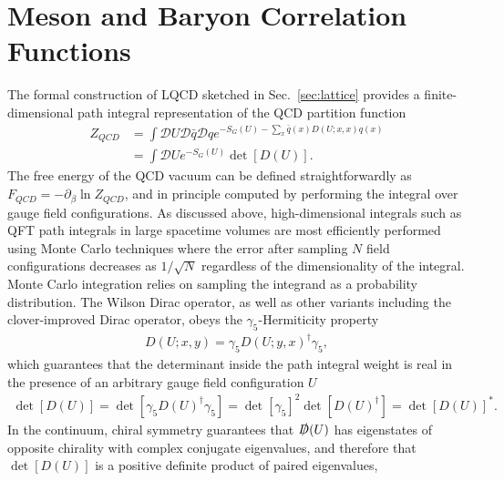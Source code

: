 \section{Meson and Baryon Correlation Functions}\label{sec:corr}

The formal construction of LQCD sketched in Sec.~\ref{sec:lattice} provides a finite-dimensional path integral representation of the QCD partition function
\begin{equation}
  \begin{split}
    Z_{QCD} &= \int \mathcal{D}U\mathcal{D}\bar{q}\mathcal{D}q e^{-S_G(U) - \sum_x \bar{q}(x)D(U;x,x)q(x)} \\
    &= \int \mathcal{D}U e^{-S_G(U)}\det[D(U)].
  \end{split}\label{eq:qcdZ}
\end{equation}
The free energy of the QCD vacuum can be defined straightforwardly as $F_{QCD} = -\partial_\beta \ln Z_{QCD}$, and in principle computed by performing the integral over gauge field configurations.
As discussed above, high-dimensional integrals such as QFT path integrals in large spacetime volumes are most efficiently performed using Monte Carlo techniques where the error after sampling $N$ field configurations decreases as $1/\sqrt{N}$ regardless of the dimensionality of the integral.
Monte Carlo integration relies on sampling the integrand as a probability distribution.
The Wilson Dirac operator, as well as other variants including the clover-improved Dirac operator, obeys the $\gamma_5$-Hermiticity property
\begin{equation}
  \begin{split}
    D(U;x,y) = \gamma_5 D(U;y,x)^\dagger \gamma_5,
  \end{split}\label{eq:g5Hermiticity}
\end{equation}
which guarantees that the determinant inside the path integral weight is real in the presence of an arbitrary gauge field configuration $U$
\begin{equation}
  \begin{split}
    \det[D(U)] = \det[\gamma_5 D(U)^\dagger \gamma_5] = \det[\gamma_5]^2 \det[D(U)^\dagger] = \det[D(U)]^*. 
  \end{split}\label{eq:positivity}
\end{equation}
In the continuum, chiral symmetry guarantees that $\slashed{D}(U)$ has eigenstates of opposite chirality with complex conjugate eigenvalues, and therefore that $\det[D(U)]$ is a positive definite product of paired eigenvalues,~\cite{Kaplan:2009yg}
